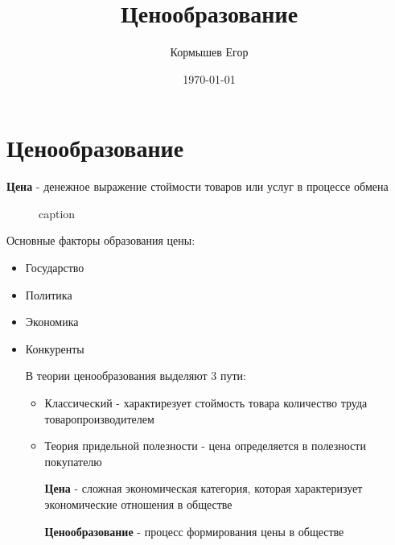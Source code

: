 \documentclass[11pt]{article}
\author{Кормышев Егор}
\date{\today}
\title{Ценообразование}
\begin{document}
\maketitle
\tableofcontents


\section{Ценообразование}
\label{sec:org9cbf881}

\textbf{Цена} - денежное выражение стоймости товаров или услуг в процессе обмена

\begin{figure}
\scalebox{0.5}{}
\caption{caption}
\end{figure}

Основные факторы образования цены:

\begin{itemize}
\item Государство
\item Политика
\item Экономика
\item Конкуренты

В теории ценообразования выделяют 3 пути:

\begin{itemize}
\item Классический - характирезует стоймость товара количество труда товаропроизводителем

\item Теория придельной полезности - цена определяется в полезности покупателю

\textbf{Цена} - сложная экономическая категория, которая характеризует экономические отношения в обществе

\textbf{Ценообразование} - процесс формирования цены в обществе
\end{itemize}
\end{itemize}
\end{document}
